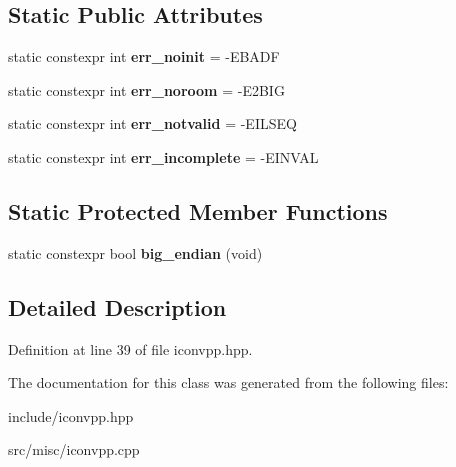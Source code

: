 \subsection*{Static Public Attributes}
\begin{DoxyCompactItemize}
\item 
\hypertarget{class__Iconv__CommonBase_ac183b286144487de81bfb67ec2c9cfd8}{static constexpr int {\bfseries err\-\_\-noinit} = -\/E\-B\-A\-D\-F}\label{class__Iconv__CommonBase_ac183b286144487de81bfb67ec2c9cfd8}

\item 
\hypertarget{class__Iconv__CommonBase_a332a8f594844739240ef5d09d4b19c16}{static constexpr int {\bfseries err\-\_\-noroom} = -\/E2\-B\-I\-G}\label{class__Iconv__CommonBase_a332a8f594844739240ef5d09d4b19c16}

\item 
\hypertarget{class__Iconv__CommonBase_a537ebd79d1d436d8708c65933573d00d}{static constexpr int {\bfseries err\-\_\-notvalid} = -\/E\-I\-L\-S\-E\-Q}\label{class__Iconv__CommonBase_a537ebd79d1d436d8708c65933573d00d}

\item 
\hypertarget{class__Iconv__CommonBase_ad772ecac58b2dc2919e0fe1004ea2240}{static constexpr int {\bfseries err\-\_\-incomplete} = -\/E\-I\-N\-V\-A\-L}\label{class__Iconv__CommonBase_ad772ecac58b2dc2919e0fe1004ea2240}

\end{DoxyCompactItemize}
\subsection*{Static Protected Member Functions}
\begin{DoxyCompactItemize}
\item 
\hypertarget{class__Iconv__CommonBase_a95f5a6378298edd22b538941006dab63}{static constexpr bool {\bfseries big\-\_\-endian} (void)}\label{class__Iconv__CommonBase_a95f5a6378298edd22b538941006dab63}

\end{DoxyCompactItemize}


\subsection{Detailed Description}


Definition at line 39 of file iconvpp.\-hpp.



The documentation for this class was generated from the following files\-:\begin{DoxyCompactItemize}
\item 
include/iconvpp.\-hpp\item 
src/misc/iconvpp.\-cpp\end{DoxyCompactItemize}
